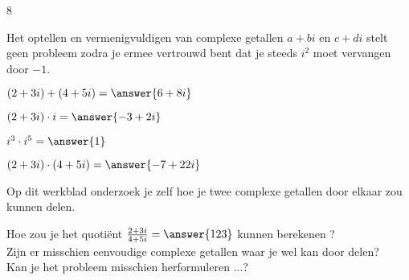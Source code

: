 8\documentclass{ximera}
\begin{document}
	\author{Wim Obbels}

    Het optellen en vermenigvuldigen van complexe getallen $a+bi$ en $c+di$ stelt geen probleem zodra je ermee vertrouwd bent dat je steeds  $i^2$ moet vervangen door $-1$.
    
    \begin{exercise}[Opwarming]\nl
        \begin{xmmulticols}
        \begin{question} $(2+3i) + (4+5i)     = \answer{6+8i}$  \end{question}
        \begin{question} $(2+3i) \cdot i      = \answer{-3+2i}$ \end{question}
        \begin{question} $i^3 \cdot i^5       = \answer{1}$     \end{question}
        \begin{question} $(2+3i) \cdot (4+5i) = \answer{-7+22i}$\end{question}
        \end{xmmulticols}
    \end{exercise}

    Op dit werkblad onderzoek je zelf hoe je twee complexe getallen door elkaar zou kunnen delen.

    \begin{denkvraag*}{}
        Hoe zou je het quotiënt $\frac{2+3i}{4+5i} = \answer {123}$ kunnen berekenen ?
        \\
        Zijn er misschien eenvoudige complexe getallen waar je wel kan door delen?
        \\
        Kan je het probleem misschien herformuleren ...?
    \end{denkvraag*}
\end{document}
